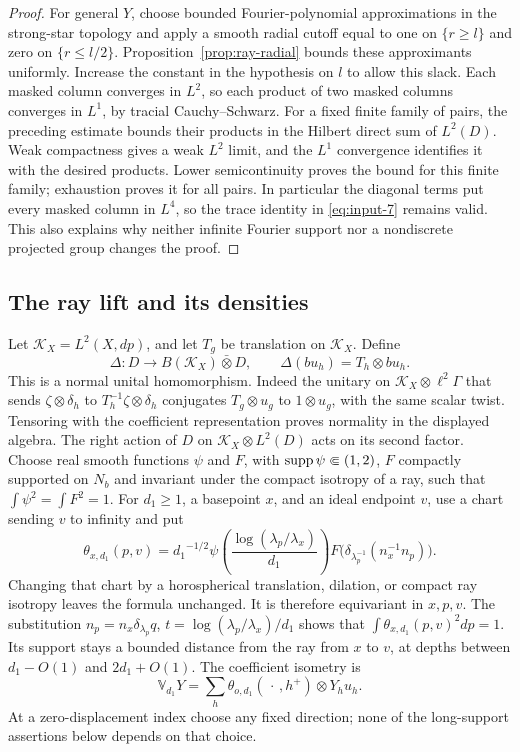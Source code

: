 \begin{proof}
For general \(Y\), choose bounded Fourier-polynomial approximations
in the strong-star topology and apply a smooth radial cutoff equal
to one on \(\{r\ge l\}\) and zero on \(\{r\le l/2\}\).
Proposition~\ref{prop:ray-radial} bounds these approximants
uniformly.  Increase the constant in the hypothesis on \(l\) to
allow this slack.  Each masked column converges in \(L^2\), so each
product of two masked columns converges in \(L^1\), by tracial
Cauchy--Schwarz.  For a fixed finite family of pairs, the preceding
estimate bounds their products in the Hilbert direct sum of
\(L^2(D)\).  Weak compactness gives a weak \(L^2\) limit, and the
\(L^1\) convergence identifies it with the desired products.
Lower semicontinuity proves the bound for this finite family;
exhaustion proves it for all pairs.  In particular the diagonal
terms put every masked column in \(L^4\), so the trace identity in
\eqref{eq:input-7} remains valid.  This also explains why neither infinite
Fourier support nor a nondiscrete projected group changes the proof.
\end{proof}

\subsection{The ray lift and its densities}

Let \(\mathcal K_X=L^2(X,dp)\), and let \(T_g\) be translation on
\(\mathcal K_X\).  Define
\[
 \Delta:D\longrightarrow B(\mathcal K_X)\bar\otimes D,
 \qquad \Delta(bu_h)=T_h\otimes bu_h.
\]
This is a normal unital homomorphism.  Indeed the unitary on
\(\mathcal K_X\otimes\ell^2\Gamma\) that sends
\(\zeta\otimes\delta_h\) to \(T_h^{-1}\zeta\otimes\delta_h\)
conjugates \(T_g\otimes u_g\) to \(1\otimes u_g\), with the same
scalar twist.  Tensoring with the coefficient representation proves
normality in the displayed algebra.
The right action of \(D\) on \(\mathcal K_X\otimes L^2(D)\) acts on its
second factor.  Choose real smooth functions \(\psi\) and \(F\), with
\(\operatorname{supp}\psi\Subset(1,2)\), \(F\) compactly supported on \(N_b\) and
invariant under the compact isotropy of a ray, such that
\(\int\psi^2=\int F^2=1\).  For \({d_1}\ge1\), a basepoint \(x\), and an
ideal endpoint \(v\), use a chart sending \(v\) to infinity and put
\begin{equation}\label{eq:ray-function}
 \theta_{x,d_1}(p,v)={d_1}^{-1/2}
 \psi\left(\frac{\log(\lambda_p/\lambda_x)}{d_1}\right)
 F\bigl(\delta_{\lambda_p^{-1}}(n_x^{-1}n_p)\bigr).
\end{equation}
Changing that chart by a horospherical translation, dilation, or
compact ray isotropy leaves the formula unchanged.  It is therefore
equivariant in \(x,p,v\).  The substitution
\(n_p=n_x\delta_{\lambda_p}q\), \(t=\log(\lambda_p/\lambda_x)/{d_1}\)
shows that \(\int\theta_{x,d_1}(p,v)^2dp=1\).
Its support stays a bounded distance from the ray from \(x\) to
\(v\), at depths between \({d_1}-O(1)\) and \(2{d_1}+O(1)\).
The coefficient isometry is
\[
 \mathbb V_{d_1}Y=\sum_h\theta_{o,d_1}(\,\cdot\,,h^+)\otimes Y_hu_h.
\]
At a zero-displacement index choose any fixed direction; none of the
long-support assertions below depends on that choice.

